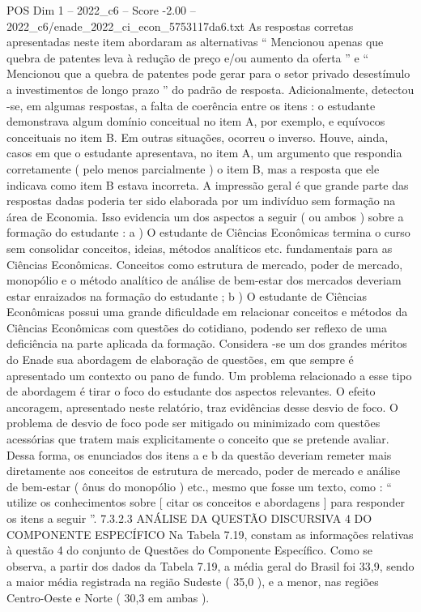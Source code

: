 \begin{textsample}{POS Dim 1 – 2022\_c6 – Score -2.00 – 2022\_c6/enade\_2022\_ci\_econ\_5753117da6.txt}
As respostas corretas apresentadas neste item abordaram as alternativas “ Mencionou apenas que quebra de patentes leva à redução de preço e/ou aumento da oferta ” e “ Mencionou que a quebra de patentes pode gerar para o setor privado desestímulo a investimentos de longo prazo ” do padrão de resposta.
Adicionalmente, detectou -se, em algumas respostas, a falta de coerência entre os itens : o estudante demonstrava algum domínio conceitual no item A, por exemplo, e equívocos conceituais no item B.
Em outras situações, ocorreu o inverso.
Houve, ainda, casos em que o estudante apresentava, no item A, um argumento que respondia corretamente ( pelo menos parcialmente ) o item B, mas a resposta que ele indicava como item B estava incorreta.
A impressão geral é que grande parte das respostas dadas poderia ter sido elaborada por um indivíduo sem formação na área de Economia.
Isso evidencia um dos aspectos a seguir ( ou ambos ) sobre a formação do estudante : a ) O estudante de Ciências Econômicas termina o curso sem consolidar conceitos, ideias, métodos analíticos etc. fundamentais para as Ciências Econômicas.
Conceitos como estrutura de mercado, poder de mercado, monopólio e o método analítico de análise de bem-estar dos mercados deveriam estar enraizados na formação do estudante ; b ) O estudante de Ciências Econômicas possui uma grande dificuldade em relacionar conceitos e métodos da Ciências Econômicas com questões do cotidiano, podendo ser reflexo de uma deficiência na parte aplicada da formação.
Considera -se um dos grandes méritos do Enade sua abordagem de elaboração de questões, em que sempre é apresentado um contexto ou pano de fundo.
Um problema relacionado a esse tipo de abordagem é tirar o foco do estudante dos aspectos relevantes.
O efeito ancoragem, apresentado neste relatório, traz evidências desse desvio de foco.
O problema de desvio de foco pode ser mitigado ou minimizado com questões acessórias que tratem mais explicitamente o conceito que se pretende avaliar.
Dessa forma, os enunciados dos itens a e b da questão deveriam remeter mais diretamente aos conceitos de estrutura de mercado, poder de mercado e análise de bem-estar ( ônus do monopólio ) etc., mesmo que fosse um texto, como : “ utilize os conhecimentos sobre [ citar os conceitos e abordagens ] para responder os itens a seguir ”. 7.3.2.3 ANÁLISE DA QUESTÃO DISCURSIVA 4 DO COMPONENTE ESPECÍFICO Na Tabela 7.19, constam as informações relativas à questão 4 do conjunto de Questões do Componente Específico.
Como se observa, a partir dos dados da Tabela 7.19, a média geral do Brasil foi 33,9, sendo a maior média registrada na região Sudeste ( 35,0 ), e a menor, nas regiões Centro-Oeste e Norte ( 30,3 em ambas ).

\end{textsample}
